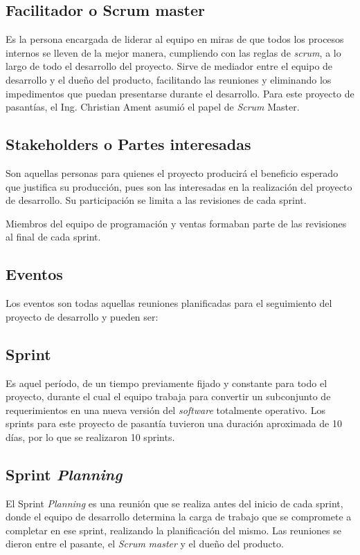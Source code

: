 \subsection{Facilitador o Scrum master}
Es la persona encargada de liderar al equipo en miras de que todos los procesos internos se lleven de la mejor manera, cumpliendo con las reglas de \emph{scrum}, a lo largo de todo el desarrollo del proyecto. Sirve de mediador entre el equipo de desarrollo y el dueño del producto, facilitando las reuniones y eliminando los impedimentos que puedan presentarse durante el desarrollo.
Para este proyecto de pasantías, el Ing. Christian Ament asumió el papel de \emph{Scrum} Master.

\subsection{Stakeholders o Partes interesadas}
Son aquellas personas para quienes el proyecto producirá el beneficio esperado que justifica su producción, pues son las interesadas en la realización del proyecto de desarrollo. Su participación se limita a las revisiones de cada sprint.

Miembros del equipo de programación y ventas formaban parte de las revisiones al final de cada sprint.

\subsection{Eventos}
Los eventos son todas aquellas reuniones planificadas para el seguimiento del proyecto de desarrollo y pueden ser:

\subsection{Sprint}
Es aquel período, de un tiempo previamente fijado y constante para todo el proyecto, durante el cual el equipo trabaja para convertir un subconjunto de requerimientos en una nueva versión del \emph{software} totalmente operativo. Los sprints para este proyecto de pasantía tuvieron una duración aproximada de 10 días, por lo que se realizaron 10 sprints.

\subsection{Sprint \emph{Planning}}
El Sprint \emph{Planning} es una reunión que se realiza antes del inicio de cada sprint, donde el equipo de desarrollo determina la carga de trabajo que se compromete a completar en ese sprint, realizando la planificación del mismo. Las reuniones se dieron entre el pasante, el \emph{Scrum} \emph{master} y el dueño del producto.

